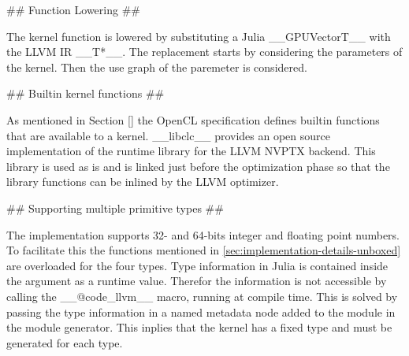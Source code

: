 \begin{markdown}
## Function Lowering ##

The kernel function is lowered by substituting a Julia
__GPUVector{T}__ with the LLVM IR __T*__. The replacement starts by
considering the parameters of the kernel. Then the use graph of the
paremeter is considered. 

## Builtin kernel functions ##

As mentioned in Section \ref{} the OpenCL specification defines
builtin functions that are available to a kernel. __libclc__
\cite{libclc} provides an open source implementation of the runtime
library for the LLVM NVPTX backend. This library is used as is and is
linked just before the optimization phase so that the library functions
can be inlined by the LLVM optimizer.

## Supporting multiple primitive types ##

The implementation supports 32- and 64-bits integer and floating point
numbers. To facilitate this the functions mentioned in
\ref{sec:implementation-details-unboxed} are overloaded for the four
types. Type information in Julia is contained inside the argument as a
runtime value. Therefor the information is not accessible by calling
the __@code_llvm__ macro, running at compile time. This is solved by
passing the type information in a named metadata node added to the
module in the module generator. This inplies that the kernel has a fixed
type and must be generated for each type.

\end{markdown}
